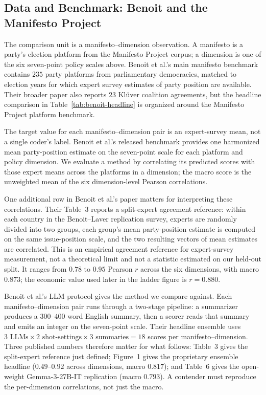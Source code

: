 \subsection{Data and Benchmark: Benoit and the Manifesto Project}

The comparison unit is a manifesto--dimension observation. A manifesto
is a party's election platform from the Manifesto Project corpus; a
dimension is one of the six seven-point policy scales above. Benoit et
al.'s main manifesto benchmark contains $235$ party platforms from
parliamentary democracies, matched to election years for which expert
survey estimates of party position are available. Their broader paper
also reports $23$ Kl\"uver coalition agreements, but the headline
comparison in Table~\ref{tab:benoit-headline} is organized around the
Manifesto Project platform benchmark.

The target value for each manifesto--dimension pair is an expert-survey
mean, not a single coder's label. Benoit et al.'s released benchmark
provides one harmonized mean party-position estimate on the seven-point
scale for each platform and policy dimension. We evaluate a method by
correlating its predicted scores with those expert means across the
platforms in a dimension; the macro score is the unweighted mean of the
six dimension-level Pearson correlations.

One additional row in Benoit et al.'s paper matters for interpreting
these correlations. Their Table~3 reports a split-expert agreement
reference: within each country in the Benoit--Laver replication survey,
experts are randomly divided into two groups, each group's mean
party-position estimate is computed on the same issue-position scale,
and the two resulting vectors of mean estimates are correlated. This is
an empirical agreement reference for expert-survey measurement, not a
theoretical limit and not a statistic estimated on our held-out
split. It ranges from $0.78$ to $0.95$ Pearson $r$ across the six
dimensions, with macro $0.873$; the economic value used later in the
ladder figure is $r = 0.880$.

Benoit et al.'s LLM protocol gives the method we compare against. Each
manifesto--dimension pair runs through a two-stage pipeline: a summarizer
produces a $300$--$400$ word English summary, then a scorer reads that
summary and emits an integer on the seven-point scale. Their headline
ensemble uses
$3 \text{ LLMs} \times 2 \text{ shot-settings} \times 3 \text{ summaries}
= 18$ scores per manifesto--dimension. Three published numbers therefore
matter for what follows: Table~3 gives the split-expert reference just
defined; Figure~1 gives the proprietary ensemble headline ($0.49$--$0.92$
across dimensions, macro $0.817$); and Table~6 gives the open-weight
Gemma-3-27B-IT replication (macro $0.793$). A contender must reproduce
the per-dimension correlations, not just the macro.


